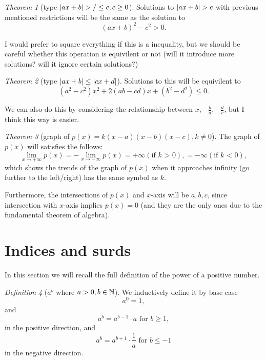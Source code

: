\documentclass[8pt]{article}
\theoremstyle{remark}
\newtheorem{theorem}{Theorem}[section]
\newtheorem{definition}[theorem]{Definition}
\begin{document}
        \begin{theorem}[type $\left\lvert ax + b \right\rvert > / \leq c, c \geq 0$]
            Solutions to $\left\lvert ax + b \right\rvert > c$ with previous mentioned restrictions will be the same as the solution to
            $$
                (ax + b)^2 - c^2 > 0.
            $$

            I would prefer to square everything if this is a inequality, but we should be careful whether this operation is equivilent or not (will it introduce more solutions? will it ignore certain solutions?)
        \end{theorem}

        \begin{theorem}[type $\left\lvert ax + b \right\rvert \leq \left\lvert cx + d \right\rvert$]
            Solutions to this will be equivilent to
            $$
            (a^2 - c^2) x^2 + 2(ab - cd)x + (b^2 - d^2) \leq 0.
            $$

            We can also do this by considering the relationship between $x, -\frac{b}{a}, -\frac{d}{c}$, but I think this way is easier.
        \end{theorem}

        \begin{theorem}[graph of $p(x) = k (x-a) (x-b) (x-c), k \neq 0$]
            The graph of $p(x)$ will satisfies the follows:
            $$
                \lim_{x \rightarrow +\infty} p(x) = - \lim_{x \rightarrow -\infty} p(x) = +\infty (\text{if $k$ > 0}), = -\infty (\text{if $k$ < 0}),
            $$
            which shows the trends of the graph of $p(x)$ when it approaches infinity (go further to the left/right) has the same symbol as $k$.

            Furthermore, the intersections of $p(x)$ and $x$-axis will be $ a, b, c$, since intersection with $x$-axis implies $p(x) = 0$ (and they are the only ones due to the fundamental theorem of algebra).
        \end{theorem}

    \section{Indices and surds}
        In this section we will recall the full definition of the power of a positive number.

        \begin{definition}[$a^b$ where $a > 0, b \in \mathbb{N}$]
            We inductively define it by base case
            $$a^0 = 1,$$
            and $$a^b = a^{b - 1} \cdot a\text{ for } b \geq 1,$$
            in the positive direction, and
            $$a^b = a^{b + 1} \cdot \frac{1}{a}\text{ for } b \leq -1$$
            in the negative direction.
        \end{definition}
\end{document}
